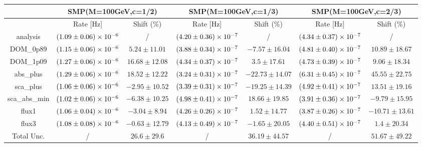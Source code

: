 \documentclass{article}%
\begin{document}
%
\scriptsize%
\noindent%
\begin{tabular}{|c||c|c|c|c|c|c|}%
\hline%
&\multicolumn{2}{|c|}{SMP(M=100GeV,c=1/2)}&\multicolumn{2}{|c|}{SMP(M=100GeV,c=1/3)}&\multicolumn{2}{|c|}{SMP(M=100GeV,c=2/3)}\\%
\hline%
&Rate {[}Hz{]}&Shift (\%)&Rate {[}Hz{]}&Shift (\%)&Rate {[}Hz{]}&Shift (\%)\\%
\hline%
\hline%
analysis&$\num{1.09 \pm 0.06e-06}$&/&$\num{4.2 \pm 0.36e-07}$&/&$\num{4.34 \pm 0.37e-07}$&/\\%
\hline%
DOM\_0p89&$\num{1.15 \pm 0.06e-06}$&$5.24 \pm 11.01$&$\num{3.88 \pm 0.34e-07}$&$-7.57 \pm 16.04$&$\num{4.81 \pm 0.4e-07}$&$10.89 \pm 18.67$\\%
\hline%
DOM\_1p09&$\num{1.27 \pm 0.06e-06}$&$16.68 \pm 12.08$&$\num{4.34 \pm 0.37e-07}$&$3.5 \pm 17.61$&$\num{4.73 \pm 0.39e-07}$&$9.06 \pm 18.34$\\%
\hline%
abs\_plus&$\num{1.29 \pm 0.06e-06}$&$18.52 \pm 12.22$&$\num{3.24 \pm 0.31e-07}$&$-22.73 \pm 14.07$&$\num{6.31 \pm 0.45e-07}$&$45.55 \pm 22.75$\\%
\hline%
sca\_plus&$\num{1.06 \pm 0.06e-06}$&$-2.95 \pm 10.52$&$\num{3.39 \pm 0.31e-07}$&$-19.25 \pm 14.39$&$\num{4.92 \pm 0.41e-07}$&$13.51 \pm 19.16$\\%
\hline%
sca\_abs\_min&$\num{1.02 \pm 0.06e-06}$&$-6.38 \pm 10.25$&$\num{4.98 \pm 0.41e-07}$&$18.66 \pm 19.85$&$\num{3.91 \pm 0.36e-07}$&$-9.79 \pm 15.95$\\%
\hline%
flux1&$\num{1.06 \pm 0.04e-06}$&$-3.04 \pm 8.94$&$\num{4.26 \pm 0.26e-07}$&$1.52 \pm 14.77$&$\num{3.87 \pm 0.26e-07}$&$-10.71 \pm 13.61$\\%
\hline%
flux3&$\num{1.08 \pm 0.08e-06}$&$-0.63 \pm 12.79$&$\num{4.13 \pm 0.49e-07}$&$-1.65 \pm 20.05$&$\num{4.4 \pm 0.51e-07}$&$1.4 \pm 20.34$\\%
\hline%
\hline%
Total Unc.&/&$26.6 \pm 29.6$&/&$36.19 \pm 44.57$&/&$51.67 \pm 49.22$\\%
\hline%
\end{tabular}%
\newline%
\end{document}
